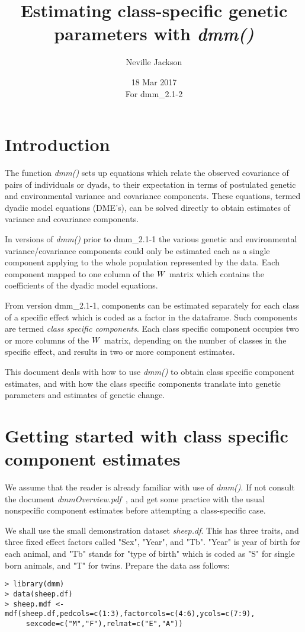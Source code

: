 \documentclass[titlepage]{article}  %
\title{ Estimating class-specific genetic parameters with {\em dmm()}}
\author{Neville Jackson }
\date{18 Mar 2017 \\
      For dmm\_2.1-2}   %
\begin{document}
 
 
\maketitle      
\tableofcontents

\section{Introduction} 
The function {\em dmm()} sets up equations which relate the observed covariance of pairs of individuals or dyads, to their expectation in terms of postulated genetic and environmental variance and covariance components.  These equations, termed dyadic model equations (DME's), can be solved directly to obtain estimates of variance and covariance components.  

In versions of {\em dmm()} prior to dmm\_2.1-1 the various genetic and environmental variance/covariance components could only be estimated each as a single component applying to the whole population represented by the data. Each component mapped to one column of the $\boldmath W$ matrix which contains the coefficients of the dyadic model equations.

From version dmm\_2.1-1, components can be estimated separately for each class of a specific effect which is coded as a factor in the dataframe. Such components are termed {\em class specific components}. Each class specific component occupies two or more columns of the $\boldmath W$ matrix, depending on the number of classes in the specific effect, and results in two or more component estimates.

This document deals with how to use {\em dmm()} to obtain class specific component estimates, and with how the class specific components translate into genetic parameters and estimates of genetic change.


 
\section{Getting started with class specific component estimates}
\label{sec:getstart}
 We assume that the reader is already familiar with use of {\em dmm()}. If not consult the document {\em dmmOverview.pdf}~\cite{jack:15}, and get some practice with the usual nonspecific component estimates before attempting a class-specific case.

 We shall use the small demonstration dataset {\em sheep.df}. This has three traits, and three fixed effect factors called "Sex", "Year", and "Tb". "Year" is year of birth for each animal, and "Tb" stands for "type of birth" which is coded as "S" for single born animals, and "T" for twins.  Prepare the data ass follows:
\begin{verbatim}
> library(dmm)
> data(sheep.df)
> sheep.mdf <- mdf(sheep.df,pedcols=c(1:3),factorcols=c(4:6),ycols=c(7:9),
     sexcode=c("M","F"),relmat=c("E","A"))
\end{verbatim}
\end{document}
